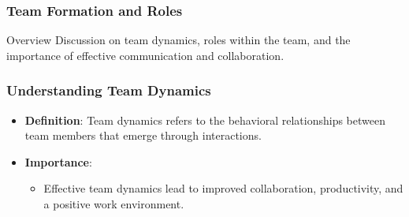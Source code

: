 \documentclass{beamer}
\begin{document}
\begin{frame}[fragile]
    \frametitle{Team Formation and Roles}
    \begin{block}{Overview}
        Discussion on team dynamics, roles within the team, and the importance of effective communication and collaboration.
    \end{block}
\end{frame}

\begin{frame}[fragile]
    \frametitle{Understanding Team Dynamics}
    \begin{itemize}
        \item \textbf{Definition}: Team dynamics refers to the behavioral relationships between team members that emerge through interactions.
        \item \textbf{Importance}:
        \begin{itemize}
            \item Effective team dynamics lead to improved collaboration, productivity, and a positive work environment.
        \end{itemize}
    \end{itemize}
\end{frame}
\end{document}
